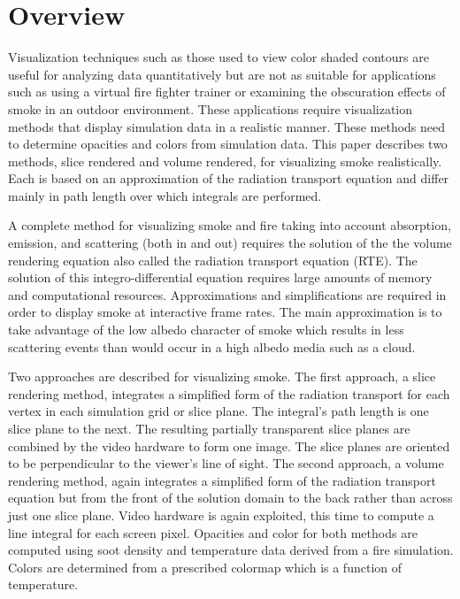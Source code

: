 %
%

\section{Overview}

Visualization techniques such as those used to view color shaded
contours are useful for analyzing data quantitatively but are not
as suitable for applications such as using a virtual fire fighter
trainer or examining the obscuration effects of smoke in an
outdoor environment.  These applications require visualization
methods that display simulation data in a realistic manner. These
methods need to determine opacities and colors from simulation
data.  This paper describes two methods, slice rendered and volume
rendered, for visualizing smoke realistically.  Each is based on
an approximation of the radiation transport equation\cite{} and
differ mainly in path length over which integrals are performed.

A complete method for visualizing smoke and fire taking into
account absorption, emission, and scattering (both in and out)
requires the solution of the the volume rendering equation\cite{}
also called the radiation transport equation (RTE)\cite{}. The
solution of this integro-differential equation requires large
amounts of memory and computational resources.  Approximations and
simplifications are required in order to display smoke at
interactive frame rates.  The main approximation is to take
advantage of the low albedo character of smoke which results in
less scattering events than would occur in a high albedo media
such as a cloud.

Two approaches are described for visualizing smoke. The first
approach, a slice rendering method, integrates a simplified form
of the radiation transport for each vertex in each simulation grid
or slice plane. The integral's path length is one slice plane to
the next. The resulting partially transparent slice planes are
combined by the video hardware to form one image. The slice planes
are oriented to be perpendicular to the viewer's line of sight.
The second approach, a volume rendering method, again integrates a
simplified form of the radiation transport equation but from the
front of the solution domain to the back rather than across just
one slice plane. Video hardware is again exploited, this time to
compute a line integral for each screen pixel.  Opacities and
color for both methods are computed using soot density and
temperature data derived from a fire simulation. Colors are
determined from a prescribed colormap which is a function of
temperature.


